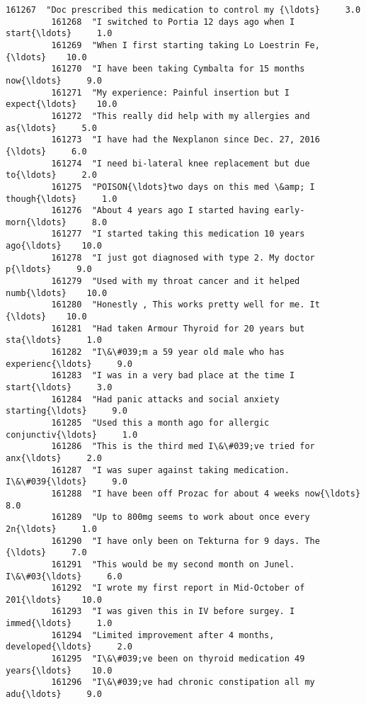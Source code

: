 \documentclass[11pt]{article}
\begin{document}
\begin{Verbatim}[commandchars=\\\{\}]
         161267  "Doc prescribed this medication to control my {\ldots}     3.0   
         161268  "I switched to Portia 12 days ago when I start{\ldots}     1.0   
         161269  "When I first starting taking Lo Loestrin Fe, {\ldots}    10.0   
         161270  "I have been taking Cymbalta for 15 months now{\ldots}     9.0   
         161271  "My experience: Painful insertion but I expect{\ldots}    10.0   
         161272  "This really did help with my allergies and as{\ldots}     5.0   
         161273  "I have had the Nexplanon since Dec. 27, 2016 {\ldots}     6.0   
         161274  "I need bi-lateral knee replacement but due to{\ldots}     2.0   
         161275  "POISON{\ldots}two days on this med \&amp; I though{\ldots}     1.0   
         161276  "About 4 years ago I started having early-morn{\ldots}     8.0   
         161277  "I started taking this medication 10 years ago{\ldots}    10.0   
         161278  "I just got diagnosed with type 2. My doctor p{\ldots}     9.0   
         161279  "Used with my throat cancer and it helped numb{\ldots}    10.0   
         161280  "Honestly , This works pretty well for me. It {\ldots}    10.0   
         161281  "Had taken Armour Thyroid for 20 years but sta{\ldots}     1.0   
         161282  "I\&\#039;m a 59 year old male who has experienc{\ldots}     9.0   
         161283  "I was in a very bad place at the time I start{\ldots}     3.0   
         161284  "Had panic attacks and social anxiety starting{\ldots}     9.0   
         161285  "Used this a month ago for allergic conjunctiv{\ldots}     1.0   
         161286  "This is the third med I\&\#039;ve tried for anx{\ldots}     2.0   
         161287  "I was super against taking medication. I\&\#039{\ldots}     9.0   
         161288  "I have been off Prozac for about 4 weeks now{\ldots}     8.0   
         161289  "Up to 800mg seems to work about once every 2n{\ldots}     1.0   
         161290  "I have only been on Tekturna for 9 days. The {\ldots}     7.0   
         161291  "This would be my second month on Junel. I\&\#03{\ldots}     6.0   
         161292  "I wrote my first report in Mid-October of 201{\ldots}    10.0   
         161293  "I was given this in IV before surgey. I immed{\ldots}     1.0   
         161294  "Limited improvement after 4 months, developed{\ldots}     2.0   
         161295  "I\&\#039;ve been on thyroid medication 49 years{\ldots}    10.0   
         161296  "I\&\#039;ve had chronic constipation all my adu{\ldots}     9.0   
         

\end{Verbatim}
\end{document}
